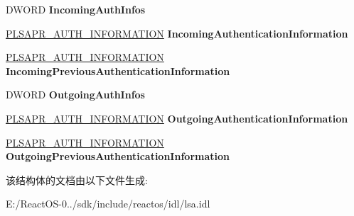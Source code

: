 \begin{DoxyCompactItemize}
\item 
\mbox{\label{struct___l_s_a_p_r___t_r_u_s_t_e_d___d_o_m_a_i_n___a_u_t_h___i_n_f_o_r_m_a_t_i_o_n_a9fd3c78a365f3672bb170701cfea21e9}} 
D\+W\+O\+RD {\bfseries Incoming\+Auth\+Infos}
\item 
\mbox{\label{struct___l_s_a_p_r___t_r_u_s_t_e_d___d_o_m_a_i_n___a_u_t_h___i_n_f_o_r_m_a_t_i_o_n_ad7acf1537eaff784d1d5f69ae1f55e71}} 
\hyperlink{struct___l_s_a_p_r___a_u_t_h___i_n_f_o_r_m_a_t_i_o_n}{P\+L\+S\+A\+P\+R\+\_\+\+A\+U\+T\+H\+\_\+\+I\+N\+F\+O\+R\+M\+A\+T\+I\+ON} {\bfseries Incoming\+Authentication\+Information}
\item 
\mbox{\label{struct___l_s_a_p_r___t_r_u_s_t_e_d___d_o_m_a_i_n___a_u_t_h___i_n_f_o_r_m_a_t_i_o_n_a5abdfb950f485961517d652fa9fd4893}} 
\hyperlink{struct___l_s_a_p_r___a_u_t_h___i_n_f_o_r_m_a_t_i_o_n}{P\+L\+S\+A\+P\+R\+\_\+\+A\+U\+T\+H\+\_\+\+I\+N\+F\+O\+R\+M\+A\+T\+I\+ON} {\bfseries Incoming\+Previous\+Authentication\+Information}
\item 
\mbox{\label{struct___l_s_a_p_r___t_r_u_s_t_e_d___d_o_m_a_i_n___a_u_t_h___i_n_f_o_r_m_a_t_i_o_n_afdc72009dd9dbc2588631fa00dbf47d4}} 
D\+W\+O\+RD {\bfseries Outgoing\+Auth\+Infos}
\item 
\mbox{\label{struct___l_s_a_p_r___t_r_u_s_t_e_d___d_o_m_a_i_n___a_u_t_h___i_n_f_o_r_m_a_t_i_o_n_a2dec8fe5782470ea607f7ab9e0d1da38}} 
\hyperlink{struct___l_s_a_p_r___a_u_t_h___i_n_f_o_r_m_a_t_i_o_n}{P\+L\+S\+A\+P\+R\+\_\+\+A\+U\+T\+H\+\_\+\+I\+N\+F\+O\+R\+M\+A\+T\+I\+ON} {\bfseries Outgoing\+Authentication\+Information}
\item 
\mbox{\label{struct___l_s_a_p_r___t_r_u_s_t_e_d___d_o_m_a_i_n___a_u_t_h___i_n_f_o_r_m_a_t_i_o_n_acdfccd28305f8a104533477d99528d99}} 
\hyperlink{struct___l_s_a_p_r___a_u_t_h___i_n_f_o_r_m_a_t_i_o_n}{P\+L\+S\+A\+P\+R\+\_\+\+A\+U\+T\+H\+\_\+\+I\+N\+F\+O\+R\+M\+A\+T\+I\+ON} {\bfseries Outgoing\+Previous\+Authentication\+Information}
\end{DoxyCompactItemize}


该结构体的文档由以下文件生成\+:\begin{DoxyCompactItemize}
\item 
E\+:/\+React\+O\+S-\/0../sdk/include/reactos/idl/lsa.\+idl\end{DoxyCompactItemize}
